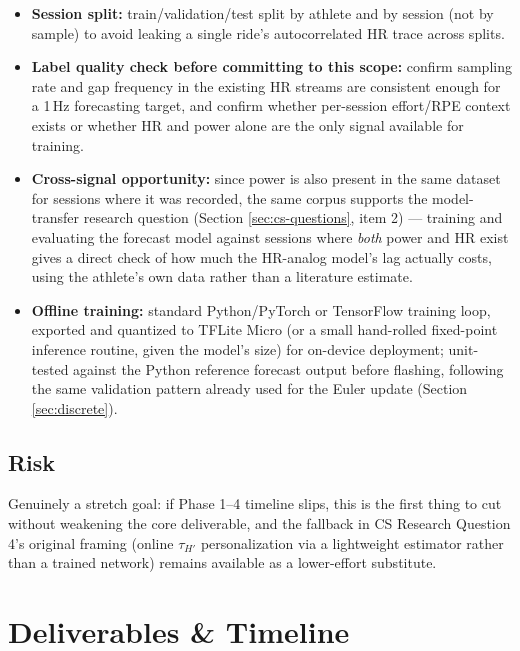 \documentclass[11pt, letterpaper]{article}
\begin{document}
\begin{itemize}
  \item \textbf{Session split:} train/validation/test split by athlete and by session (not by
    sample) to avoid leaking a single ride's autocorrelated HR trace across splits.
  \item \textbf{Label quality check before committing to this scope:} confirm sampling rate and
    gap frequency in the existing HR streams are consistent enough for a 1\,Hz forecasting
    target, and confirm whether per-session effort/RPE context exists or whether HR and power
    alone are the only signal available for training.
  \item \textbf{Cross-signal opportunity:} since power is also present in the same dataset for
    sessions where it was recorded, the same corpus supports the model-transfer research
    question (Section \ref{sec:cs-questions}, item 2) --- training and evaluating the forecast
    model against sessions where \emph{both} power and HR exist gives a direct check of how much
    the HR-analog model's lag actually costs, using the athlete's own data rather than a
    literature estimate.
  \item \textbf{Offline training:} standard Python/PyTorch or TensorFlow training loop, exported
    and quantized to TFLite Micro (or a small hand-rolled fixed-point inference routine, given
    the model's size) for on-device deployment; unit-tested against the Python reference
    forecast output before flashing, following the same validation pattern already used for the
    Euler update (Section \ref{sec:discrete}).
\end{itemize}

\subsection{Risk}

Genuinely a stretch goal: if Phase 1--4 timeline slips, this is the first thing to cut without
weakening the core deliverable, and the fallback in CS Research Question 4's original framing
(online $\tau_{H'}$ personalization via a lightweight estimator rather than a trained network)
remains available as a lower-effort substitute.

\section{Deliverables \& Timeline}
\label{sec:timeline}
\end{document}
